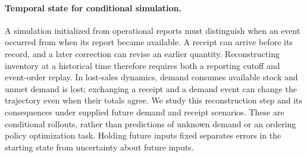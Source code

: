 \paragraph{Temporal state for conditional simulation.}
A simulation initialized from operational reports must distinguish when an event
occurred from when its report became available. A receipt can arrive before its
record, and a later correction can revise an earlier quantity. Reconstructing
inventory at a historical time therefore requires both a reporting cutoff and
event-order replay. In lost-sales dynamics, demand consumes available stock and
unmet demand is lost; exchanging a receipt and a demand event can change the
trajectory even when their totals agree. We study this reconstruction step and
its consequences under supplied future demand and receipt scenarios. These are
conditional rollouts, rather than predictions of unknown demand or an ordering
policy optimization task. Holding future inputs fixed separates errors in the
starting state from uncertainty about future inputs.

